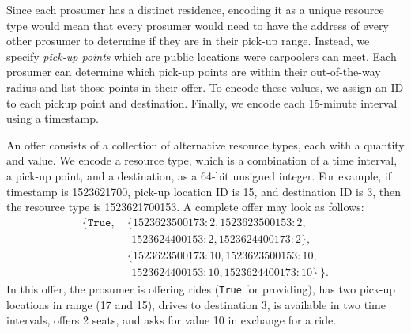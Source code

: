 Since each prosumer has a distinct residence, encoding it as a unique resource type would mean that every  prosumer would need to have the address of every other prosumer to determine if they are in their pick-up range. Instead, we specify \textit{pick-up points} which are public locations were carpoolers can meet. Each prosumer can determine which pick-up points are within their out-of-the-way radius and list those points in their offer. To encode these values, we assign an ID to each pickup point and destination. Finally, we encode each 15-minute interval using a timestamp. %

An offer consists of a collection of alternative resource types, each with a quantity and value.
We encode a resource type, which is a combination of a time interval, a pick-up point, and  a destination, as a 64-bit unsigned integer. %
For example, if timestamp is 1523621700,  pick-up location ID is 15, and destination ID is 3, then the resource type is 1523621700153. %
A complete offer may look as follows: 
\begin{align*}
      \{ \texttt{True}, ~ %
     & \{1523623500173: 2, %
        1523623500153: 2, \\
     &  ~\,1523624400153: 2, %
        1523624400173: 2\}, \\
     & \{1523623500173: 10, %
        1523623500153: 10, \\
     & ~\,1523624400153: 10, %
        1523624400173: 10\} ~\} .
\end{align*}
%
In this offer, the prosumer is offering rides (\texttt{True} for providing), has two pick-up locations in range (17 and 15), drives to destination 3, is available in two time intervals, offers 2 seats, and asks for value 10 in exchange for a ride. %

